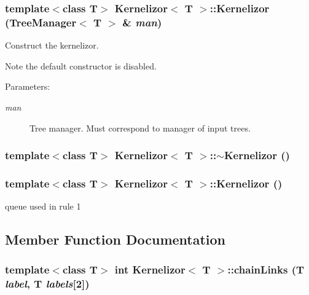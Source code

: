 \subsubsection{\setlength{\rightskip}{0pt plus 5cm}template$<$class T$>$ {\bf Kernelizor}$<$ T $>$::{\bf Kernelizor} ({\bf Tree\-Manager}$<$ T $>$ \& {\em man})}\label{classKernelizor_a0}


Construct the kernelizor. 

Note the default constructor is disabled. \begin{Desc}
\item[Parameters:]
\begin{description}
\item[{\em man}]Tree manager. Must correspond to manager of input trees. \end{description}
\end{Desc}
\subsubsection{\setlength{\rightskip}{0pt plus 5cm}template$<$class T$>$ {\bf Kernelizor}$<$ T $>$::$\sim${\bf Kernelizor} ()}\label{classKernelizor_a1}


\subsubsection{\setlength{\rightskip}{0pt plus 5cm}template$<$class T$>$ {\bf Kernelizor}$<$ T $>$::{\bf Kernelizor} ()\hspace{0.3cm}{\tt  [private]}}\label{classKernelizor_d0}


queue used in rule 1 



\subsection{Member Function Documentation}
\subsubsection{\setlength{\rightskip}{0pt plus 5cm}template$<$class T$>$ int {\bf Kernelizor}$<$ T $>$::chain\-Links (T {\em label}, T {\em labels}[2])\hspace{0.3cm}{\tt  [protected]}}\label{classKernelizor_b3}



